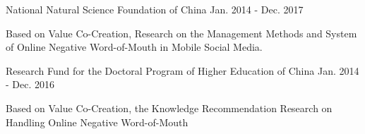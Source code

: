 
\begin{cventries}
\vspace{-1.0mm}

\cvexperience
{National Natural Science Foundation of China}
{Jan. 2014 - Dec. 2017}
{
    \begin{cvitems}
    \item {Based on Value Co-Creation, Research on the Management Methods and System of Online Negative Word-of-Mouth in Mobile Social Media.}
    \end{cvitems}
}

\cvexperience
{Research Fund for the Doctoral Program of Higher Education of China}
{Jan. 2014 - Dec. 2016}
{
    \begin{cvitems}
    \item {Based on Value Co-Creation, the Knowledge Recommendation Research on Handling Online Negative Word-of-Mouth}
    \end{cvitems}
}

\end{cventries}